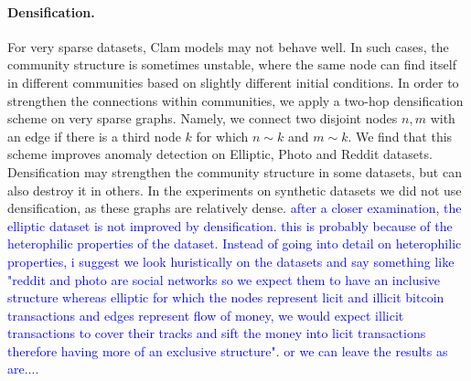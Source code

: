 \documentclass[letterpaper]{article} %
\newcommand{\ron}[1]{{{\textcolor{red}{\textbf{[Ron:} {#1}\textbf{]}}}}}
\begin{document}



\paragraph{Densification.}
\label{sec: densification definition}
For very sparse datasets, Clam models may not behave well. In such cases, the community structure is sometimes unstable, where the same node can find itself in different communities based on slightly different initial conditions. In order to strengthen the connections within communities, we apply a two-hop densification scheme on very sparse graphs. Namely, we connect two disjoint nodes $n,m$ with an edge if there is a third node $k$ for which $n \sim k$ and $m\sim k$. We find that this scheme improves anomaly detection on Elliptic, Photo and Reddit datasets. 
Densification may strengthen the community structure in some datasets, but can also destroy it in others. In the experiments on synthetic datasets we did not use densification, as these graphs are relatively dense.
\textcolor{blue}{after a closer examination, the elliptic dataset is not improved by densification. this is probably because of the heterophilic properties of the dataset. Instead of going into detail on heterophilic properties, i suggest we look huristically on the datasets and say something like "reddit and photo are social networks so we expect them to have an inclusive structure whereas elliptic for which the nodes represent licit and illicit bitcoin transactions and edges represent flow of money, we would expect illicit transactions to cover their tracks and sift the money into licit transactions therefore having more of an exclusive structure". or we can leave the results as are.... 
}
\end{document}

